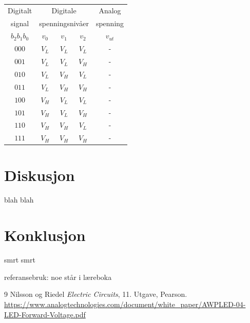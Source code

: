 \documentclass[11pt,a4paper,twocolumn]{article}
\begin{document}
\begin{center}
	\begin{tabular}{c|ccc|c}
		Digitalt & \multicolumn{3}{c|}{Digitale } & Analog \\ [-0.2cm]
		signal & \multicolumn{3}{c|}{spenningsnivåer} & spenning \\
		$b_2b_1b_0$ & $v_0$ & $v_1$ & $v_2$ & $v_{ut}$ \\
		\hline
		$000$ & $V_L$ & $V_L$ & $V_L$ & - \\
		$001$ & $V_L$ & $V_L$ & $V_H$ & - \\
		$010$ & $V_L$ & $V_H$ & $V_L$ & - \\
		$011$ & $V_L$ & $V_H$ & $V_H$ & - \\
		$100$ & $V_H$ & $V_L$ & $V_L$ & - \\
		$101$ & $V_H$ & $V_L$ & $V_H$ & - \\
		$110$ & $V_H$ & $V_H$ & $V_L$ & - \\
		$111$ & $V_H$ & $V_H$ & $V_H$ & - \\
	\end{tabular}
\end{center}

\section{Diskusjon}

blah blah

\section{Konklusjon}

smrt smrt

referansebruk: noe står i læreboka \cite{laerebok}

\begin{thebibliography}{9}
Nilsson og Riedel \textit{Electric Circuits}, 11. Utgave, Pearson.
\url{https://www.analogtechnologies.com/document/white_paper/AWPLED-04-LED-Forward-Voltage.pdf}
\end{thebibliography}
\end{document}
